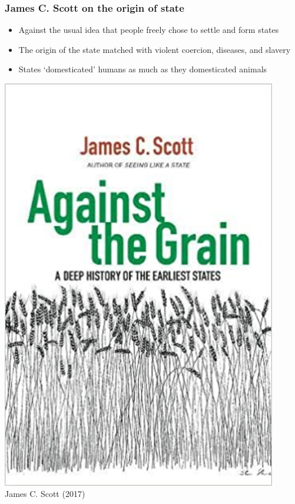 \documentclass[aspectratio=43]{beamer}
\begin{document}
\begin{frame}
\frametitle{James C. Scott on the origin of state}
\centering

\begin{minipage}{0.6\textwidth}\centering
  \begin{itemize}
    \item Against the usual idea that people freely chose to settle and form states
    \item The origin of the state matched with violent coercion, diseases, and slavery
    \item States `domesticated' humans as much as they domesticated animals
  \end{itemize}
\end{minipage}\hfill
\begin{minipage}{0.39\textwidth}\centering
  \includegraphics[width = 0.9\textwidth]{img/scott_against}\\
  James C. Scott (2017)
\end{minipage}

\end{frame}
\end{document}

